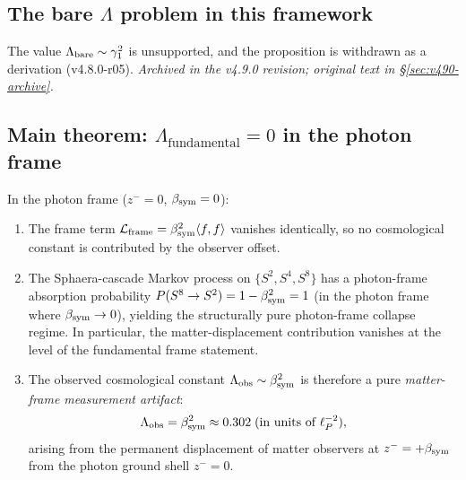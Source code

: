 \subsection{The bare $\Lambda$ problem in this framework}

\begin{proposition}\label{prop:bare-lambda}
The value \(\Lambda_{\rm bare}\sim\gamma_1^2\) is unsupported, and the proposition is withdrawn as a derivation (v4.8.0-r05).
\emph{Archived in the v4.9.0 revision; original text in \S\ref{sec:v490-archive}.}
\end{proposition}

\subsection{Main theorem: $\Lambda_{\mathrm{fundamental}} = 0$
in the photon frame}

\begin{theorem}
\label{thm:lambda-zero}
In the photon frame ($z^- = 0$, $\beta_{\mathrm{sym}} = 0$):
\begin{enumerate}
\item[(i)] The frame term $\mathcal{L}_{\mathrm{frame}} = \beta_{\mathrm{sym}}^2
 \langle f,f\rangle$ vanishes identically, so no cosmological
 constant is contributed by the observer offset.
\item[(ii)] The Sphaera-cascade Markov process on $\{S^2, S^4, S^8\}$
 has a photon-frame absorption probability
 $P(S^8 \to S^2) = 1 - \beta_{\mathrm{sym}}^2 = 1$ (in the photon frame
 where $\beta_{\mathrm{sym}}\to 0$), yielding the structurally pure photon-frame collapse regime. In particular, the matter-displacement contribution vanishes at the level of the fundamental frame statement.
\item[(iii)] The observed cosmological constant
 $\Lambda_{\mathrm{obs}} \sim \beta_{\mathrm{sym}}^2$ is therefore a pure
 \emph{matter-frame measurement artifact}:
 \[
 \Lambda_{\mathrm{obs}}
 = \beta_{\mathrm{sym}}^2 \approx 0.302\;(\text{in units of }\ell_P^{-2}),
 \]
 arising from the permanent displacement of matter observers at
 $z^- = +\beta_{\mathrm{sym}}$ from the photon ground shell $z^- = 0$.
\end{enumerate}
\end{theorem}

